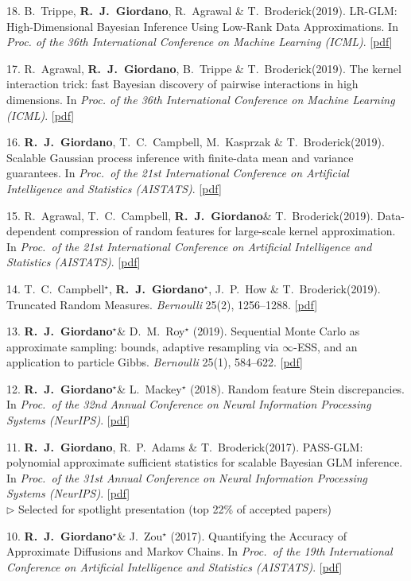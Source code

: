 \documentclass[margin,line]{res}
\newcommand{\me}{\textbf{R.~J.~Giordano}\xspace}
\newcommand{\mestar}{\textbf{R.~J.~Giordano}$^{\star}$\xspace}
\newcommand{\trevor}{T.~C.~Campbell\xspace}
\newcommand{\trevorstar}{T.~C.~Campbell$^{\star}$\xspace}
\newcommand{\tamara}{T.~Broderick\xspace}
\newcommand{\paperref}[1]{[\href{#1}{pdf}]}
\newcommand{\paperref}[1]{}
\begin{document}
\begin{resume}
18. B.~Trippe, \me, R.~Agrawal \& \tamara (2019).
LR-GLM: High-Dimensional Bayesian Inference Using Low-Rank Data Approximations.
In \emph{Proc. of the 36th International Conference on Machine Learning (ICML)}.
\paperref{https://arxiv.org/abs/1905.07499}

17.  R.~Agrawal, \me, B.~Trippe \& \tamara (2019).
The kernel interaction trick: fast Bayesian discovery of pairwise interactions in high dimensions.
In \emph{Proc. of the 36th International Conference on Machine Learning (ICML)}.
\paperref{https://arxiv.org/pdf/1905.06501}

16. \me, \trevor, M.~Kasprzak \& \tamara (2019).
Scalable Gaussian process inference with finite-data mean and variance guarantees.
In \emph{Proc.~of the 21st International Conference on Artificial Intelligence and Statistics (AISTATS)}.
\paperref{https://arxiv.org/abs/1806.10234}

15. R.~Agrawal, \trevor, \me \& \tamara (2019).
Data-dependent compression of random features for large-scale kernel approximation.
In \emph{Proc.~of the 21st International Conference on Artificial Intelligence and Statistics (AISTATS)}.
\paperref{https://arxiv.org/abs/1810.04249}

14. \trevorstar, \mestar, J.~P.~How \& \tamara (2019).
Truncated Random Measures.
\emph{Bernoulli} 25(2), 1256--1288.
\paperref{http://arxiv.org/abs/1603.00861}

13.  \mestar \& D.~M.~Roy$^{\star}$ (2019).
Sequential Monte Carlo as approximate sampling: bounds, adaptive resampling via $\infty$-ESS, and an application to particle Gibbs.
\emph{Bernoulli} 25(1), 584--622.
\paperref{http://arxiv.org/abs/1503.00966}

12. \mestar \& L.~Mackey$^{\star}$ (2018).
Random feature Stein discrepancies.
In \emph{Proc.\ of the 32nd Annual Conference on Neural Information Processing Systems (NeurIPS)}.
\paperref{https://arxiv.org/abs/1806.07788}

11. \me, R.~P.~Adams \& \tamara (2017).
PASS-GLM: polynomial approximate sufficient statistics for scalable Bayesian GLM inference.
In \emph{Proc.\ of the 31st Annual Conference on Neural Information Processing Systems (NeurIPS)}.
\paperref{http://arxiv.org/abs/1709.09216} \\
\quad$\rhd$ Selected for spotlight presentation (top 22\% of accepted papers)

10. \mestar \& J.~Zou$^{\star}$ (2017).
Quantifying the Accuracy of Approximate Diffusions and Markov Chains.
In \emph{Proc.~of the 19th International Conference on Artificial Intelligence and Statistics (AISTATS)}.
\paperref{http://arxiv.org/abs/1605.06420}


\end{resume}
\end{document}
